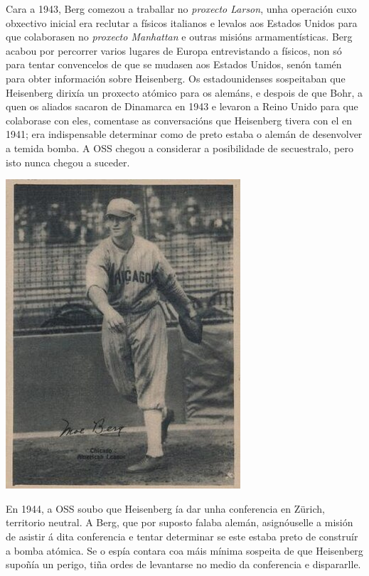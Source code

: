 \begin{refsection}
\begin{multicols}{2}
Cara a 1943, Berg comezou a traballar no \textit{proxecto Larson}, unha
operación cuxo obxectivo inicial era reclutar a físicos italianos e levalos aos
Estados Unidos para que colaborasen no \textit{proxecto Manhattan} e outras
misións armamentísticas. Berg acabou por percorrer varios lugares de Europa
entrevistando a físicos, non só para tentar convencelos de que se mudasen aos
Estados Unidos, senón tamén para obter información sobre Heisenberg. Os
estadounidenses sospeitaban que Heisenberg dirixía un proxecto atómico para os
alemáns, e despois de que Bohr, a quen os aliados sacaron de Dinamarca en 1943
e levaron a Reino Unido para que colaborase con eles, comentase as
conversacións que Heisenberg tivera con el en 1941; era indispensable
determinar como de preto estaba o alemán de desenvolver a temida bomba. A OSS
chegou a considerar a posibilidade de secuestralo, pero isto nunca chegou a
suceder.

\begin{centering}
    \includegraphics[width=0.55\linewidth]{revistas/002/imaxes/bergChicago.jpg}
\end{centering}

En 1944, a OSS soubo que Heisenberg ía dar unha conferencia en Zürich,
territorio neutral. A Berg, que por suposto falaba alemán, asignóuselle a
misión de asistir á dita conferencia e tentar determinar se este estaba preto
de construír a bomba atómica. Se o espía contara coa máis mínima sospeita de
que Heisenberg supoñía un perigo, tiña ordes de levantarse no medio da
conferencia e dispararlle.


\end{multicols}
\end{refsection}
